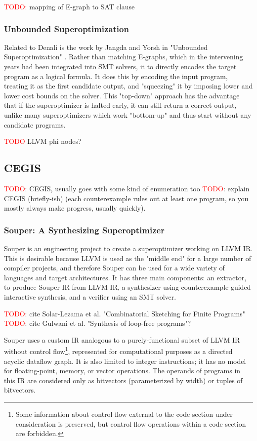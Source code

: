 \documentclass[12pt,twoside]{reedthesis}
\newcommand{\red}[1]{\textcolor{red}{#1}}
\begin{document}
\red{TODO:} mapping of E-graph to SAT clause

\subsubsection{Unbounded Superoptimization}
Related to Denali is the work by Jangda and Yorsh in "Unbounded Superoptimization" \cite{jangda2017unbounded}.
Rather than matching E-graphs, which in the intervening years had been integrated into SMT solvers, it to directly encodes the target program as a logical formula.
It does this by encoding the input program, treating it as the first candidate output, and "squeezing" it by imposing lower and lower cost bounds on the solver. This "top-down" approach has the advantage that if the superoptimizer is halted early, it can still return a correct output, unlike many superoptimizers which work "bottom-up" and thus start without any candidate programs.

\red{TODO} LLVM phi nodes?

\subsection{CEGIS}

\red{TODO}: CEGIS, usually goes with some kind of enumeration too
\red{TODO}: explain CEGIS (briefly-ish) (each counterexample rules out at least one program, so you mostly always make progress, usually quickly).

\subsubsection{Souper: A Synthesizing Superoptimizer}
Souper \cite{sasnauskas2017souper} is an engineering project to create a superoptimizer working on LLVM IR.
This is desirable because LLVM is used as the "middle end" for a large number of compiler projects, and therefore Souper can be used for a wide variety of languages and target architectures.
It has three main components:
    an extractor, to produce Souper IR from LLVM IR,
    a synthesizer using counterexample-guided interactive synthesis,
    and a verifier using an SMT solver.

\red{TODO}: cite Solar-Lezama et al. "Combinatorial Sketching for Finite Programs"
\red{TODO}: cite Gulwani et al. "Synthesis of loop-free programs"?

Souper uses a custom IR analogous to a purely-functional subset of LLVM IR without control flow\footnote{Some information about control flow external to the code section under consideration is preserved, but control flow operations within a code section are forbidden.}, represented for computational purposes as a directed acyclic dataflow graph.
It is also limited to integer instructions; it has no model for floating-point, memory, or vector operations.
The operands of programs in this IR are considered only as bitvectors (parameterized by width) or tuples of bitvectors.
\end{document}
